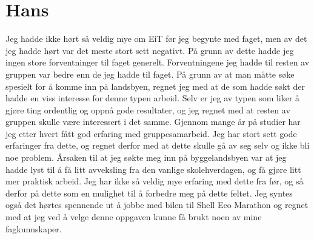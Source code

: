 \section{ Hans}
Jeg hadde ikke hørt så veldig mye om EiT før jeg begynte med faget, men av det jeg hadde hørt var det meste stort sett negativt. På grunn av dette hadde jeg ingen store forventninger til faget generelt. \newline
Forventningene jeg hadde til resten av gruppen var bedre enn de jeg hadde til faget. På grunn av at man måtte søke spesielt for å komme inn på landsbyen, regnet jeg med at de som hadde søkt der hadde en viss interesse for denne typen arbeid. Selv er jeg av typen som liker å gjøre ting ordentlig og oppnå gode resultater, og jeg regnet med at resten av gruppen skulle være interessert i det samme.\newline
Gjennom mange år på studier har jeg etter hvert fått god erfaring med gruppesamarbeid. Jeg har stort sett gode erfaringer fra dette, og regnet derfor med at dette skulle gå av seg selv og ikke bli noe problem.\newline 
Årsaken til at jeg søkte meg inn på byggelandsbyen var at jeg hadde lyst til å få litt avveksling fra den vanlige skolehverdagen, og få gjøre litt mer praktisk arbeid. Jeg har ikke så veldig mye erfaring med dette fra før, og så derfor på dette som en mulighet til å forbedre meg på dette feltet. Jeg syntes også det hørtes spennende ut å jobbe med bilen til Shell Eco Marathon og regnet med at jeg ved å velge denne oppgaven kunne få brukt noen av mine fagkunnskaper.

